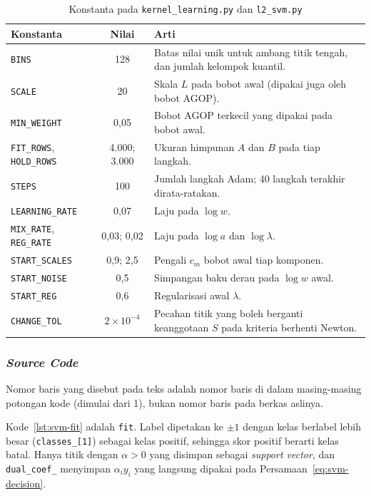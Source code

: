 \begin{table}[H]
	\centering
	\caption{Konstanta pada \texttt{kernel\_learning.py} dan \texttt{l2\_svm.py}}
	\label{tab:svm-konstanta-baru}
	\small
	\begin{tabularx}{\textwidth}{l c Y}
		\toprule
		\textbf{Konstanta} & \textbf{Nilai} & \textbf{Arti} \\
		\midrule
		\texttt{BINS} & 128 & Batas nilai unik untuk ambang titik tengah, dan jumlah kelompok kuantil. \\
		\texttt{SCALE} & 20 & Skala $L$ pada bobot awal (dipakai juga oleh bobot AGOP). \\
		\texttt{MIN\_WEIGHT} & 0,05 & Bobot AGOP terkecil yang dipakai pada bobot awal. \\
		\texttt{FIT\_ROWS}, \texttt{HOLD\_ROWS} & 4.000; 3.000 & Ukuran himpunan $A$ dan $B$ pada tiap langkah. \\
		\texttt{STEPS} & 100 & Jumlah langkah Adam; 40 langkah terakhir dirata-ratakan. \\
		\texttt{LEARNING\_RATE} & 0,07 & Laju pada $\log w$. \\
		\texttt{MIX\_RATE}, \texttt{REG\_RATE} & 0,03; 0,02 & Laju pada $\log a$ dan $\log \lambda$. \\
		\texttt{START\_SCALES} & 0,9; 2,5 & Pengali $c_m$ bobot awal tiap komponen. \\
		\texttt{START\_NOISE} & 0,5 & Simpangan baku derau pada $\log w$ awal. \\
		\texttt{START\_REG} & 0,6 & Regularisasi awal $\lambda$. \\
		\texttt{CHANGE\_TOL} & $2 \times 10^{-4}$ & Pecahan titik yang boleh berganti keanggotaan $S$ pada kriteria berhenti Newton. \\
		\bottomrule
	\end{tabularx}
\end{table}

\subsubsection{\textit{Source Code}}
Nomor baris yang disebut pada teks adalah nomor baris di dalam masing-masing potongan kode (dimulai dari 1), bukan nomor baris pada berkas aslinya.

Kode~\ref{lst:svm-fit} adalah \texttt{fit}. Label dipetakan ke $\pm 1$ dengan kelas berlabel lebih besar (\texttt{classes\_[1]}) sebagai kelas positif, sehingga skor positif berarti kelas batal. Hanya titik dengan $\alpha > 0$ yang disimpan sebagai \textit{support vector}, dan \texttt{dual\_coef\_} menyimpan $\alpha_i y_i$ yang langsung dipakai pada Persamaan~\eqref{eq:svm-decision}.

